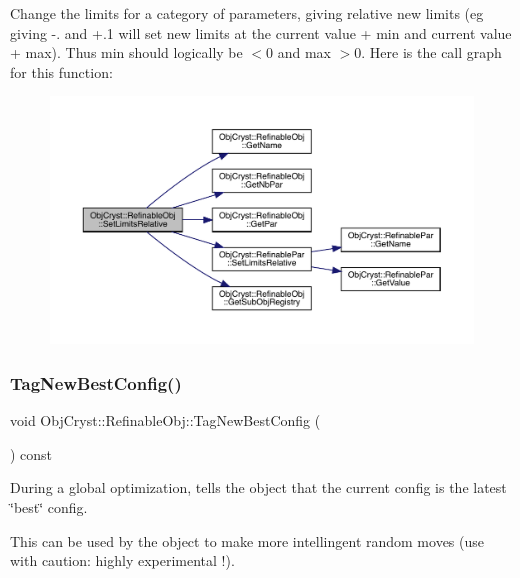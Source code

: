 Change the limits for a category of parameters, giving relative new limits (eg giving -\/. and +.1 will set new limits at the current value + min and current value + max). Thus min should logically be $<$0 and max $>$0. Here is the call graph for this function\+:
\nopagebreak
\begin{figure}[H]
\begin{center}
\leavevmode
\includegraphics[width=350pt]{class_obj_cryst_1_1_refinable_obj_ae8d497fc43ac3f166a21781a62dfa25d_cgraph}
\end{center}
\end{figure}
\mbox{\label{class_obj_cryst_1_1_refinable_obj_a8961de41ffb5a91f2850cb4cb0160072}} 
\subsubsection{\texorpdfstring{TagNewBestConfig()}{TagNewBestConfig()}}
{\footnotesize\ttfamily void Obj\+Cryst\+::\+Refinable\+Obj\+::\+Tag\+New\+Best\+Config (\begin{DoxyParamCaption}{ }\end{DoxyParamCaption}) const\hspace{0.3cm}{\ttfamily [virtual]}}

During a global optimization, tells the object that the current config is the latest \char`\"{}best\char`\"{} config.

This can be used by the object to make more intellingent random moves (use with caution\+: highly experimental !). \mbox{\label{class_obj_cryst_1_1_refinable_obj_ac3164266424f984c8322f614c986f671}} 
